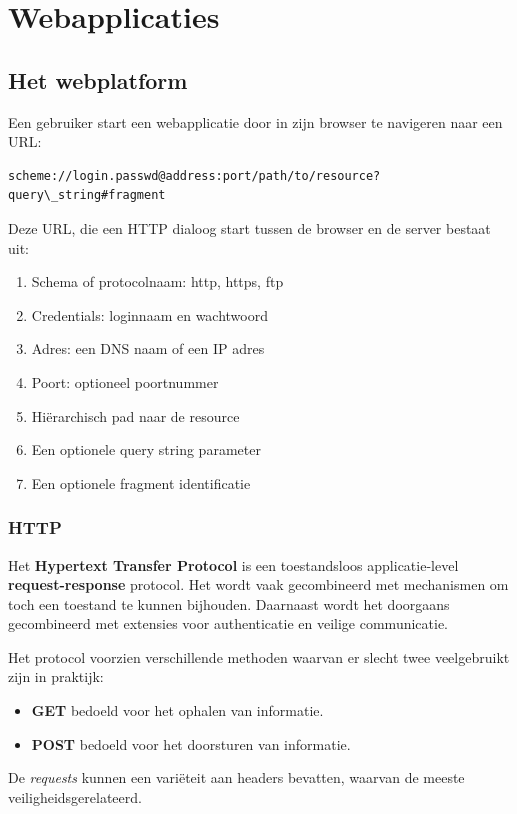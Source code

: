 \documentclass[../main.tex]{subfiles}
\begin{document}
\chapter{Webapplicaties}

\section{Het webplatform}
Een gebruiker start een webapplicatie door in zijn browser te navigeren naar een URL:

\begin{lstlisting}[caption=URL]
scheme://login.passwd@address:port/path/to/resource?query\_string#fragment
\end{lstlisting}
Deze URL, die een HTTP dialoog start tussen de browser en de server bestaat uit:
\begin{multicols}{2}
\begin{enumerate}
	\item Schema of protocolnaam: http, https, ftp
	\item Credentials: loginnaam en wachtwoord
	\item Adres: een DNS naam of een IP adres
	\item Poort: optioneel poortnummer
	\item Hi\"erarchisch pad naar de resource
	\item Een optionele query string parameter
	\item Een optionele fragment identificatie 
\end{enumerate}
\end{multicols}

\subsection{HTTP}
Het \textbf{Hypertext Transfer Protocol} is een toestandsloos applicatie-level \textbf{request-response} protocol. Het wordt vaak gecombineerd met mechanismen om toch een toestand te kunnen bijhouden. Daarnaast wordt het doorgaans gecombineerd met extensies voor authenticatie en veilige communicatie. 

Het protocol voorzien verschillende methoden waarvan er slecht twee veelgebruikt zijn in praktijk:
\begin{itemize}
	\item \textbf{GET} bedoeld voor het ophalen van informatie. 
	\item \textbf{POST} bedoeld voor het doorsturen van informatie.
\end{itemize}
De \textit{requests} kunnen een vari\"eteit aan headers bevatten, waarvan de meeste veiligheidsgerelateerd.
\end{document}
